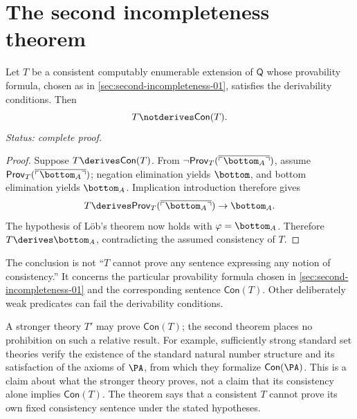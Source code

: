\section{The second incompleteness theorem}
\label{sec:second-incompleteness-03}

\begin{theorem}
\label{thm:godel-second}
Let \(T\) be a consistent computably enumerable extension of \(\mathsf Q\) whose provability
formula, chosen as in \cref{sec:second-incompleteness-01}, satisfies the
derivability conditions.  Then
\[
  T\notderives\mathsf{Con}(T).
\]
\textit{Status: complete proof.}
\end{theorem}

\begin{proof}
Suppose \(T\derives\mathsf{Con}(T)\).  From
\(\neg\mathsf{Prov}_T(\overline{\ulcorner\bottom_A\urcorner})\), assume
\(\mathsf{Prov}_T(\overline{\ulcorner\bottom_A\urcorner})\); negation
elimination yields \(\bottom\), and bottom elimination yields \(\bottom_A\).
Implication introduction therefore gives
\[
  T\derives
  \mathsf{Prov}_T(\overline{\ulcorner\bottom_A\urcorner})\to\bottom_A.
\]
The hypothesis of L\"ob's theorem now holds with \(\varphi=\bottom_A\).
Therefore \(T\derives\bottom_A\), contradicting the assumed consistency of
\(T\).
\end{proof}

\begin{warning}
The conclusion is not ``\(T\) cannot prove any sentence expressing any notion
of consistency.''  It concerns the particular provability formula chosen in
\cref{sec:second-incompleteness-01} and the corresponding sentence
\(\mathsf{Con}(T)\).  Other deliberately weak predicates can fail the
derivability conditions.
\end{warning}

\begin{example}
A stronger theory \(T'\) may prove \(\mathsf{Con}(T)\); the second theorem
places no prohibition on such a relative result.  For example, sufficiently
strong standard set theories verify the existence of the standard natural
number structure and its satisfaction of the axioms of \(\PA\), from which
they formalize \(\mathsf{Con}(\PA)\).  This is a claim about what the stronger
theory proves, not a claim that its consistency alone implies
\(\mathsf{Con}(T)\).  The theorem says that a consistent \(T\) cannot prove its
own fixed consistency sentence under the stated hypotheses.
\end{example}
